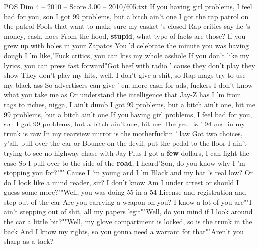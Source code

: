 \begin{textsample}{POS Dim 4 – 2010 – Score 3.00 – 2010/605.txt}  \label{ex:f4_pos_033}
If you having girl problems, I feel bad for you, son I got 99 problems, but a bitch ain't one I got the rap patrol on the patrol Fools that want to make sure my casket 's closed Rap critics say he 's money, cash, hoes From the hood, \textbf{stupid}, what type of facts are those?
If you grew up with holes in your Zapatos You 'd celebrate the minute you was having dough I 'm like,"Fuck critics, you can kiss my whole asshole If you don't like my lyrics, you can press fast forward"Got beef with radio ' cause they don't play they show They don't play my hits, well, I don't give a shit, so Rap mags try to use my black ass So advertisers can give ' em more cash for ads, fuckers I don't know what you take me as Or understand the intelligence that Jay-Z has I 'm from rags to riches, nigga, I ain't dumb I got 99 problems, but a bitch ain't one, hit me 99 problems, but a bitch ain't one If you having girl problems, I feel bad for you, son I got 99 problems, but a bitch ain't one, hit me The year is ' 94 and in my trunk is raw In my rearview mirror is the motherfuckin ' law Got two choices, y'all, pull over the car or Bounce on the devil, put the pedal to the floor I ain't trying to see no highway chase with Jay Plus I got a \textbf{few} dollars, I can fight the case So I pull over to the side of the \textbf{road}, I heard"Son, do you know why I 'm stopping you for?""' Cause I 'm young and I 'm Black and my hat 's real low?
Or do I look like a mind reader, sir?
I don't know Am I under arrest or should I guess some more?""Well, you was doing 55 in a 54 License and registration and step out of the car Are you carrying a weapon on you?
I know a lot of you are""I ain't stepping out of shit, all my papers legit""Well, do you mind if I look around the car a little bit?""Well, my glove compartment is locked, so is the trunk in the back And I know my rights, so you gonna need a warrant for that""Aren't you sharp as a tack?

\end{textsample}
